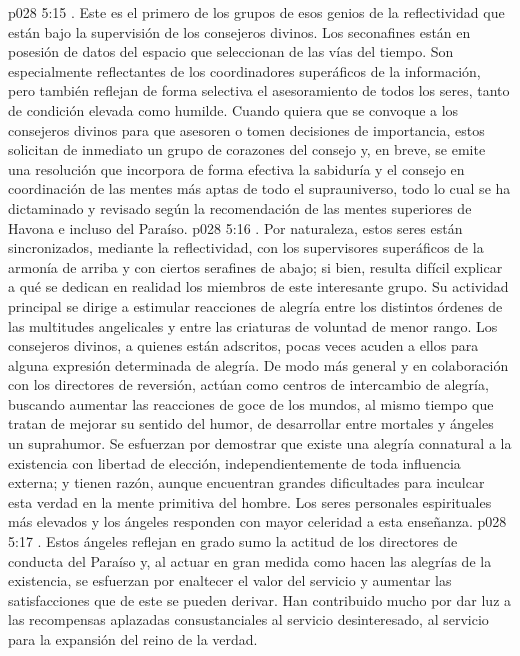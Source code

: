 \vs p028 5:15 . Este es el primero de los grupos de esos genios de la reflectividad que están bajo la supervisión de los consejeros divinos. Los seconafines están en posesión de datos del espacio que seleccionan de las vías del tiempo. Son especialmente reflectantes de los coordinadores superáficos de la información, pero también reflejan de forma selectiva el asesoramiento de todos los seres, tanto de condición elevada como humilde. Cuando quiera que se convoque a los consejeros divinos para que asesoren o tomen decisiones de importancia, estos solicitan de inmediato un grupo de corazones del consejo y, en breve, se emite una resolución que incorpora de forma efectiva la sabiduría y el consejo en coordinación de las mentes más aptas de todo el suprauniverso, todo lo cual se ha dictaminado y revisado según la recomendación de las mentes superiores de Havona e incluso del Paraíso.
\vs p028 5:16 . Por naturaleza, estos seres están sincronizados, mediante la reflectividad, con los supervisores superáficos de la armonía de arriba y con ciertos serafines de abajo; si bien, resulta difícil explicar a qué se dedican en realidad los miembros de este interesante grupo. Su actividad principal se dirige a estimular reacciones de alegría entre los distintos órdenes de las multitudes angelicales y entre las criaturas de voluntad de menor rango. Los consejeros divinos, a quienes están adscritos, pocas veces acuden a ellos para alguna expresión determinada de alegría. De modo más general y en colaboración con los directores de reversión, actúan como centros de intercambio de alegría, buscando aumentar las reacciones de goce de los mundos, al mismo tiempo que tratan de mejorar su sentido del humor, de desarrollar entre mortales y ángeles un suprahumor. Se esfuerzan por demostrar que existe una alegría connatural a la existencia con libertad de elección, independientemente de toda influencia externa; y tienen razón, aunque encuentran grandes dificultades para inculcar esta verdad en la mente primitiva del hombre. Los seres personales espirituales más elevados y los ángeles responden con mayor celeridad a esta enseñanza.
\vs p028 5:17 . Estos ángeles reflejan en grado sumo la actitud de los directores de conducta del Paraíso y, al actuar en gran medida como hacen las alegrías de la existencia, se esfuerzan por enaltecer el valor del servicio y aumentar las satisfacciones que de este se pueden derivar. Han contribuido mucho por dar luz a las recompensas aplazadas consustanciales al servicio desinteresado, al servicio para la expansión del reino de la verdad.
